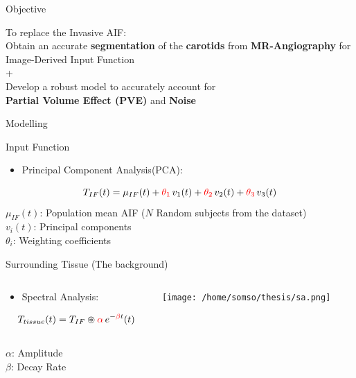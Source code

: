 \documentclass[aspectratio=169]{beamer}
\begin{document}
\begin{frame}{Objective}
	\centering\Large

	To replace the Invasive AIF:\\Obtain an accurate \textbf{segmentation} of the \textbf{carotids} from \textbf{MR-Angiography} for Image-Derived Input Function\\
	\bigskip
	+ \\
	\bigskip
	\Large{Develop a robust model to accurately account for \\
		\textbf{Partial Volume Effect (PVE)} and \textbf{Noise}}
\end{frame}

\begin{frame}{Modelling}
	\small
	\begin{block}{Input Function}
		\begin{itemize}
            \item Principal Component Analysis(PCA):
		\end{itemize}

		\[
			T_{IF}(t) = \mu_{IF}(t) +  \textcolor{red}{\theta_1}\,v_1(t) +  \textcolor{red}{\theta_2}\,v_2(t) +  \textcolor{red}{\theta_3}\,v_3(t)
		\]
		\(\mu_{IF}(t)\): Population mean AIF ($N$ Random subjects from the dataset)\\
		\(v_{i}(t)\): Principal components \\
		\(\theta_{i}\): Weighting coefficients
	\end{block}
	\pause
    \begin{block}{Surrounding Tissue (The background)}
		\vspace{4pt}
		\begin{columns}[T]
			\begin{column}[T]{0.6\textwidth}
				\begin{itemize}
					\item
					      Spectral Analysis:
				\end{itemize}
				\vspace{1ex}
				\[
					T_{tissue}(t) = T_{IF} \circledast \textcolor{red}{\alpha}\,e^{-\textcolor{red}{\beta}t} (t)
				\]
				\\
				$\alpha$: Amplitude\\
				$\beta$: Decay Rate
			\end{column}

			\begin{column}{0.25\textwidth}
				\texttt{[image: /home/somso/thesis/sa.png]}
			\end{column}
		\end{columns}
	\end{block}
\end{frame}
\end{document}
